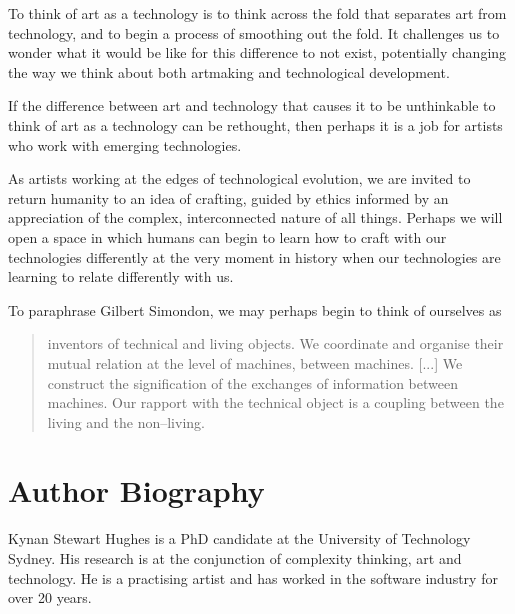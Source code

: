 \documentclass[letter:wpaper]{article}
\begin{document}
    To think of art as a technology is to think across the fold that separates art from technology, and to begin a process of smoothing out the fold. It challenges us to wonder what it would be like for this difference to not exist, potentially changing the way we think about both artmaking and technological development.
    
    If the difference between art and technology that causes it to be unthinkable to think of art as a technology can be rethought, then perhaps it is a job for artists who work with emerging technologies. 
    
    As artists working at the edges of technological evolution, we are invited to return humanity to an idea of crafting, guided by ethics informed by an appreciation of the complex, interconnected nature of all things. Perhaps we will open a space in which humans can begin to learn how to craft with our technologies differently at the very moment in history when our technologies are learning to relate differently with us.
    
    To paraphrase Gilbert Simondon, we may perhaps begin to think of ourselves as

    \begin{quote}
        inventors of technical and living objects. We coordinate and organise their mutual relation at the level of machines, between machines. [...] We construct the signification of the exchanges of information between machines. Our rapport with the technical object is a coupling between the living and the non–living. \citep[p.xvi]{SimondonOnThMdOfExstncOfTechnclObjcts1980}
    \end{quote}
    



\section{Author Biography}

Kynan Stewart Hughes is a PhD candidate at the University of Technology Sydney. His research is at the conjunction of complexity thinking, art and technology. He is a practising artist and has worked in the software industry for over 20 years. 
\end{document}
